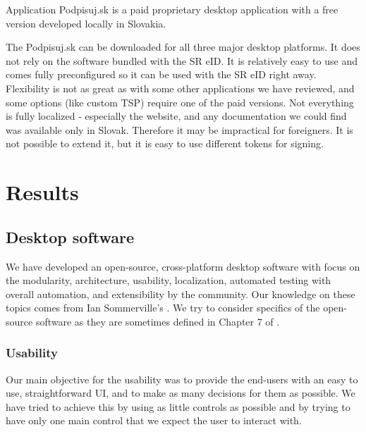 \documentclass[thesismargins, english, thesislinespacing, onelinechapterstyle, upjsfrontpage]{rnthesis}
\begin{document}
Application Podpisuj.sk is a paid proprietary desktop application with a free version developed locally in Slovakia.


The Podpisuj.sk can be downloaded for all three major desktop platforms.
It does not rely on the software bundled with the SR eID.
It is relatively easy to use and comes fully preconfigured so it can be used with the SR eID right away.
Flexibility is not as great as with some other applications we have reviewed, and some options (like custom TSP) require one of the paid versions.
Not everything is fully localized - especially the website, and any documentation we could find was available only in Slovak.
Therefore it may be impractical for foreigners.
It is not possible to extend it, but it is easy to use different tokens for signing.

\chapter{Results}

\section{Desktop software}

We have developed an open-source, cross-platform desktop software with focus on the modularity, architecture, usability, localization, automated testing with overall automation, and extensibility by the community.
Our knowledge on these topics comes from Ian Sommerville's \cite{sommerville}.
We try to consider specifics of the open-source software as they are sometimes defined in Chapter 7 of \cite{oss}.

\subsection{Usability}

Our main objective for the usability was to provide the end-users with an easy to use, straightforward UI, and to make as many decisions for them as possible.
We have tried to achieve this by using as little controls as possible and by trying to have only one main control that we expect the user to interact with.

\end{document}

